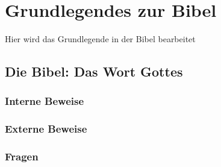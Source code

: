 \section{Grundlegendes zur Bibel}
Hier wird das Grundlegende in der Bibel bearbeitet
\subsection{Die Bibel: Das Wort Gottes}
\subsubsection{Interne Beweise}
\subsubsection{Externe Beweise}
\subsubsection{Fragen}

